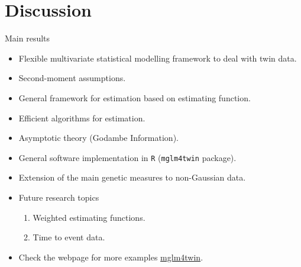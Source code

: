 \documentclass[
  ignorenonframetext,
  serif,
  professionalfont,
  usenames,
  dvipsnames,
  aspectratio = 169]{beamer}
\providecommand{\tightlist}{%
  \setlength{\itemsep}{0pt}\setlength{\parskip}{0pt}}
\renewcommand{\tightlist}{%
  \setlength{\itemsep}{0\baselineskip}
  \setlength{\parskip}{0.25\baselineskip}
}
\begin{document}
\hypertarget{discussion}{%
\section{Discussion}\label{discussion}}

\begin{frame}{Main results}
\protect\hypertarget{main-results}{}
\begin{itemize}
\tightlist
\item
  Flexible multivariate statistical modelling framework to deal with
  twin data.
\item
  Second-moment assumptions.
\item
  General framework for estimation based on estimating function.
\item
  Efficient algorithms for estimation.
\item
  Asymptotic theory (Godambe Information).
\item
  General software implementation in \texttt{R} (\texttt{mglm4twin}
  package).
\item
  Extension of the main genetic measures to non-Gaussian data.
\item
  Future research topics

  \begin{enumerate}
  \tightlist
  \item
    Weighted estimating functions.
  \item
    Time to event data.
  \end{enumerate}
\item
  Check the webpage for more examples
  \href{http://www.leg.ufpr.br/~wagner/mglm4twin}{mglm4twin}.
\end{itemize}
\end{frame}
\end{document}
